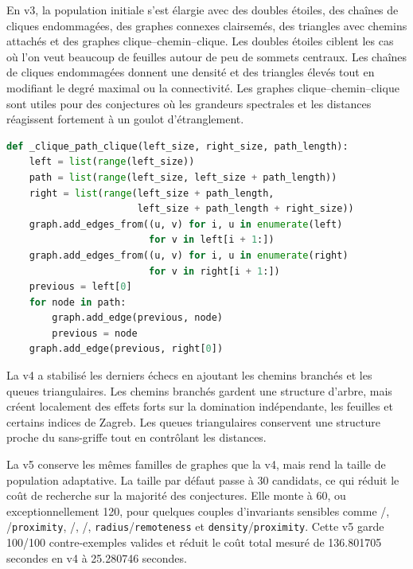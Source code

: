 \documentclass[11pt,a4paper]{article}
\begin{document}
En v3, la population initiale s'est élargie avec des doubles étoiles, des chaînes de cliques endommagées, des graphes connexes clairsemés, des triangles avec chemins attachés et des graphes clique--chemin--clique. Les doubles étoiles ciblent les cas où l'on veut beaucoup de feuilles autour de peu de sommets centraux. Les chaînes de cliques endommagées donnent une densité et des triangles élevés tout en modifiant le degré maximal ou la connectivité. Les graphes clique--chemin--clique sont utiles pour des conjectures où les grandeurs spectrales et les distances réagissent fortement à un goulot d'étranglement.

\begin{lstlisting}[language=Python,caption={Exemple de graine clique--chemin--clique.}]
def _clique_path_clique(left_size, right_size, path_length):
    left = list(range(left_size))
    path = list(range(left_size, left_size + path_length))
    right = list(range(left_size + path_length,
                       left_size + path_length + right_size))
    graph.add_edges_from((u, v) for i, u in enumerate(left)
                         for v in left[i + 1:])
    graph.add_edges_from((u, v) for i, u in enumerate(right)
                         for v in right[i + 1:])
    previous = left[0]
    for node in path:
        graph.add_edge(previous, node)
        previous = node
    graph.add_edge(previous, right[0])
\end{lstlisting}

La v4 a stabilisé les derniers échecs en ajoutant les chemins branchés et les queues triangulaires. Les chemins branchés gardent une structure d'arbre, mais créent localement des effets forts sur la domination indépendante, les feuilles et certains indices de Zagreb. Les queues triangulaires conservent une structure proche du sans-griffe tout en contrôlant les distances.

La v5 conserve les mêmes familles de graphes que la v4, mais rend la taille de population adaptative. La taille par défaut passe à 30 candidats, ce qui réduit le coût de recherche sur la majorité des conjectures. Elle monte à 60, ou exceptionnellement 120, pour quelques couples d'invariants sensibles comme /, /\texttt{proximity}, /, /, \texttt{radius}/\texttt{remoteness} et \texttt{density}/\texttt{proximity}. Cette v5 garde 100/100 contre-exemples valides et réduit le coût total mesuré de 136.801705 secondes en v4 à 25.280746 secondes.
\end{document}
